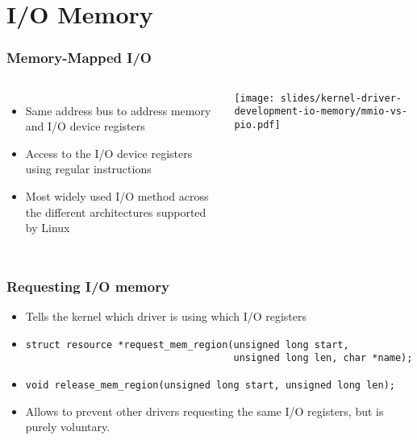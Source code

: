 \section{I/O Memory}

\begin{frame}
  \frametitle{Memory-Mapped I/O}
  \begin{columns}
  \begin{itemize}
    \item Same address bus to address memory and I/O device registers
    \item Access to the I/O device registers using regular instructions
    \item Most widely used I/O method across the different
      architectures supported by Linux
  \end{itemize}
    \texttt{[image: slides/kernel-driver-development-io-memory/mmio-vs-pio.pdf]}
  \end{columns}
\end{frame}

\begin{frame}[fragile]
  \frametitle{Requesting I/O memory}
  \begin{itemize}
  \item Tells the kernel which driver is using which I/O registers
  \item
\begin{verbatim}
struct resource *request_mem_region(unsigned long start,
                                    unsigned long len, char *name);
\end{verbatim}
  \item
\begin{verbatim}
void release_mem_region(unsigned long start, unsigned long len);
  \end{verbatim}
  \item Allows to prevent other drivers requesting the same I/O registers,
    but is purely voluntary.
\end{itemize}
\end{frame}

